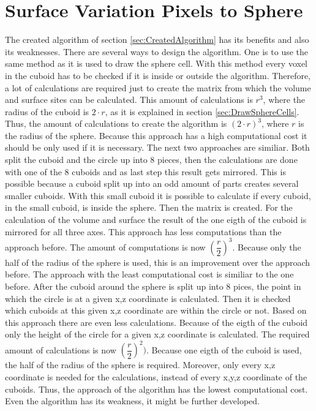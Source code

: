 \section{Surface Variation Pixels to Sphere}
The created algorithm of section \ref{sec:CreatedAlgorithm} has its benefits and also its weaknesses. There are several ways to design the algorithm. One is to use the same method as it is used to draw the sphere cell. With this method every voxel in the cuboid has to be checked if it is inside or outside the algorithm. Therefore, a lot of calculations are required just to create the matrix from which the volume and surface sites can be calculated. This amount of calculations is $r^{3}$, where the radius of the cuboid is $2 \cdot r$, as it is explained in section \ref{sec:DrawSphereCells}. Thus, the amount of calculations to create the algorithm is $(2 \cdot r)^{3}$, where $r$ is the radius of the sphere. Because this approach has a high computational cost it should be only used if it is necessary. \newline
The next two approaches are similiar. Both split the cuboid and the circle up into 8 pieces, then the calculations are done with one of the 8 cuboids and as last step this result gets mirrored. This is possible because a cuboid split up into an odd amount of parts creates several smaller cuboids. With this small cuboid it is possible to calculate if every cuboid, in the small cuboid, is inside the sphere. Then the matrix is created. For the calculation of the volume and surface the result of the one eigth of the cuboid is mirrored for all three axes. This approach has less computations than the approach before. The amount of computations is now $(\dfrac{r}{2})^{3}$. Because only the half of the radius of the sphere is used, this is an improvement over the approach before. \newline
The approach with the least computational cost is similiar to the one before. After the cuboid around the sphere is split up into 8 pices, the point in which the circle is at a given x,z coordinate is calculated. Then it is checked which cuboids at this given x,z coordinate are within the circle or not. Based on this approach there are even less calculations. Because of the eigth of the cuboid only the height of the circle for a given x,z coordinate is calculated. The required amount of calculations is now $(\dfrac{r}{2})^{2})$. Because one eigth of the cuboid is used, the half of the radius of the sphere is required. Moreover, only every x,z coordinate is needed for the calculations, instead of every x,y,z coordinate of the cuboids. Thus, the approach of the algorithm has the lowest computational cost. Even the algorithm has its weakness, it might be further developed.

